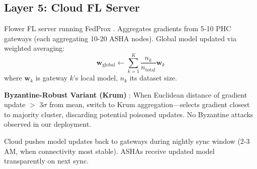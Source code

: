\documentclass[conference,compsoc]{IEEEtran}
\begin{document}
\subsection{Layer 5: Cloud FL Server}

Flower FL server \cite{flower_fl} running FedProx \cite{fedprox}. Aggregates gradients from 5-10 PHC gateways (each aggregating 10-20 ASHA nodes). Global model updated via weighted averaging:
\[
\mathbf{w}_{\text{global}} \leftarrow \sum_{k=1}^K \frac{n_k}{n_{\text{total}}} \mathbf{w}_k
\]
where \(\mathbf{w}_k\) is gateway \(k\)'s local model, \(n_k\) its dataset size.

\textbf{Byzantine-Robust Variant (Krum)} \cite{krum_byzantine}: When Euclidean distance of gradient update \(>\) 3\(\sigma\) from mean, switch to Krum aggregation—selects gradient closest to majority cluster, discarding potential poisoned updates. No Byzantine attacks observed in our deployment.

Cloud pushes model updates back to gateways during nightly sync window (2-3 AM, when connectivity most stable). ASHAs receive updated model transparently on next sync.
\end{document}
